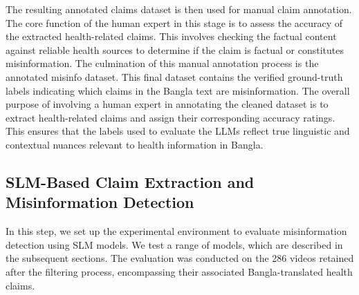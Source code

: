 \documentclass[]{article}
\begin{document}
The resulting annotated claims dataset is then used for manual claim
annotation. The core function of the human expert in this stage is to
assess the accuracy of the extracted health-related claims. This
involves checking the factual content against reliable health sources to
determine if the claim is factual or constitutes misinformation. The
culmination of this manual annotation process is the annotated misinfo
dataset. This final dataset contains the verified ground-truth labels
indicating which claims in the Bangla text are misinformation. The
overall purpose of involving a human expert in annotating the cleaned
dataset is to extract health-related claims and assign their
corresponding accuracy ratings. This ensures that the labels used to
evaluate the LLMs reflect true linguistic and contextual nuances
relevant to health information in Bangla.

\subsection{SLM-Based Claim Extraction and Misinformation Detection}

In this step, we set up the experimental environment to evaluate
misinformation detection using SLM models. We test a range of models,
which are described in the subsequent sections. The evaluation was conducted on the 286 videos retained
after the filtering process, encompassing their associated
Bangla-translated health claims.
\end{document}
